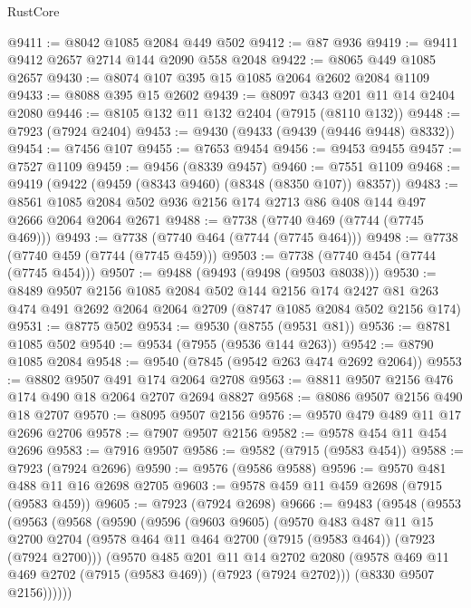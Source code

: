 \begin{lexlean}{RustCore}
\begin{coremodule}
@9411 := @8042 @1085 @2084 @449 @502
@9412 := @87 @936
@9419 := @9411 @9412 @2657 @2714 @144 @2090 @558 @2048
@9422 := @8065 @449 @1085 @2657
@9430 := @8074 @107 @395 @15 @1085 @2064 @2602 @2084 @1109
@9433 := @8088 @395 @15 @2602
@9439 := @8097 @343 @201 @11 @14 @2404 @2080
@9446 := @8105 @132 @11 @132 @2404 (@7915 (@8110 @132))
@9448 := @7923 (@7924 @2404)
@9453 := @9430 (@9433 (@9439 (@9446 @9448) @8332))
@9454 := @7456 @107
@9455 := @7653 @9454
@9456 := @9453 @9455
@9457 := @7527 @1109
@9459 := @9456 (@8339 @9457)
@9460 := @7551 @1109
@9468 := @9419 (@9422 (@9459 (@8343 @9460) (@8348 (@8350 @107)) @8357))
@9483 := @8561 @1085 @2084 @502 @936 @2156 @174 @2713 @86 @408 @144 @497 @2666 @2064 @2064 @2671
@9488 := @7738 (@7740 @469 (@7744 (@7745 @469)))
@9493 := @7738 (@7740 @464 (@7744 (@7745 @464)))
@9498 := @7738 (@7740 @459 (@7744 (@7745 @459)))
@9503 := @7738 (@7740 @454 (@7744 (@7745 @454)))
@9507 := @9488 (@9493 (@9498 (@9503 @8038)))
@9530 := @8489
    @9507
    @2156
    @1085
    @2084
    @502
    @144
    @2156
    @174
    @2427
    @81
    @263
    @474
    @491
    @2692
    @2064
    @2064
    @2709
    (@8747 @1085 @2084 @502 @2156 @174)
@9531 := @8775 @502
@9534 := @9530 (@8755 (@9531 @81))
@9536 := @8781 @1085 @502
@9540 := @9534 (@7955 (@9536 @144 @263))
@9542 := @8790 @1085 @2084
@9548 := @9540 (@7845 (@9542 @263 @474 @2692 @2064))
@9553 := @8802 @9507 @491 @174 @2064 @2708
@9563 := @8811 @9507 @2156 @476 @174 @490 @18 @2064 @2707 @2694 @8827
@9568 := @8086 @9507 @2156 @490 @18 @2707
@9570 := @8095 @9507 @2156
@9576 := @9570 @479 @489 @11 @17 @2696 @2706
@9578 := @7907 @9507 @2156
@9582 := @9578 @454 @11 @454 @2696
@9583 := @7916 @9507
@9586 := @9582 (@7915 (@9583 @454))
@9588 := @7923 (@7924 @2696)
@9590 := @9576 (@9586 @9588)
@9596 := @9570 @481 @488 @11 @16 @2698 @2705
@9603 := @9578 @459 @11 @459 @2698 (@7915 (@9583 @459))
@9605 := @7923 (@7924 @2698)
@9666 := @9483
    (@9548
      (@9553
        (@9563
          (@9568
            (@9590
              (@9596
                (@9603 @9605)
                (@9570
                  @483
                  @487
                  @11
                  @15
                  @2700
                  @2704
                  (@9578 @464 @11 @464 @2700 (@7915 (@9583 @464)) (@7923 (@7924 @2700)))
                  (@9570
                    @485
                    @201
                    @11
                    @14
                    @2702
                    @2080
                    (@9578 @469 @11 @469 @2702 (@7915 (@9583 @469)) (@7923 (@7924 @2702)))
                    (@8330 @9507 @2156))))))

\end{coremodule}
\end{lexlean}

